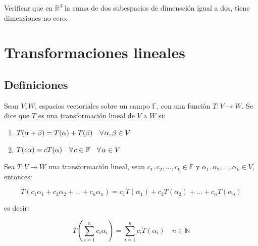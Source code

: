		\begin{ejercicio}
			Verificar que en $\mathbb{R}^3$ la suma de dos subespacios de dimensción igual a dos, tiene dimensiones no cero.
		\end{ejercicio}

\newpage
\section{Transformaciones lineales}

	\subsection{Definiciones}

		\begin{definicion}
			Sean $V, W$, espacios vectoriales sobre un campo $\mathbb{F}$, con una función $T \colon V \to W$.
			Se dice que $T$ es una transformación lineal de $V$ a $W$ si:

			\begin{enumerate}
				\item $T(\alpha + \beta) = T(\alpha) + T(\beta) \quad \forall \mkern2mu \alpha, \beta \in V$
				\item $T(c \alpha) = c T(\alpha) \quad \forall \mkern2mu c \in \mathbb{F} \quad \forall \mkern2mu \alpha \in V$
			\end{enumerate}
		\end{definicion}

		\begin{proposicion}
			Sea $T \colon V \to W$ una transformación lineal, sean $c_1, c_2, \dots, c_k \in \mathbb{F}$ y $\alpha_1, \alpha_2, \dots, \alpha_k \in V$, entonces:

			\begin{equation*}
				T(c_1 \alpha_1 + c_2 \alpha_2 + \dots + c_n \alpha_n) = c_1 T(\alpha_1) + c_2 T(\alpha_2) + \dots + c_n T(\alpha_n)
			\end{equation*}

			es decir:

			\begin{equation}
				T \left( \sum_{i=1}^n c_i \alpha_i \right) = \sum_{i=1}^n c_i T(\alpha_i) \quad n \in \mathbb{N}
			\end{equation}
		\end{proposicion}

